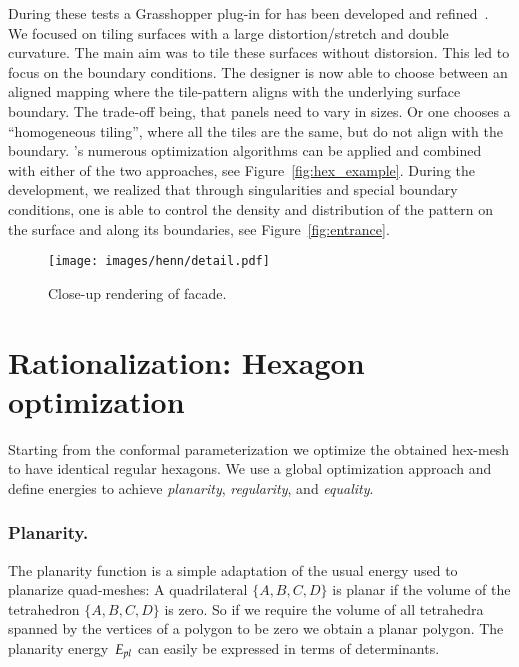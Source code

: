\documentclass[Thesis.tex]{subfiles}
\begin{document}
During these tests a Grasshopper plug-in for \VaryLab has been developed 
and refined~\cite{varylab-web-page}. We focused
on tiling surfaces with a large distortion/stretch and double
curvature. The main aim was to tile these surfaces without
distorsion. This led to focus on the boundary conditions. The designer
is now able to choose between an aligned mapping where the tile-pattern
aligns with the underlying surface boundary. The trade-off being, that
panels need to vary in sizes. Or one chooses a ``homogeneous tiling'',
where all the tiles are the same, but do not align with the
boundary. \VaryLab's numerous optimization algorithms can be applied
and combined with either of the two approaches, see
Figure~\ref{fig:hex_example}. During the development, we realized that
through singularities and special boundary conditions, one is able to
control the density and distribution of the pattern on the surface and
along its boundaries, see Figure~\ref{fig:entrance}.

\begin{figure}[bt]
  \centering
  \texttt{[image: images/henn/detail.pdf]}
  \caption{Close-up rendering of facade.}
  \label{fig:detail}
\end{figure}


\newcommand{\Ealpha}{E_\alpha}
\newcommand{\Eedge}{E_\ell}

\section{Rationalization: Hexagon optimization}
\label{sec:regular_hexagons}

Starting from the conformal parameterization we optimize the obtained
hex-mesh to have identical regular hexagons. We use a global
optimization approach and define energies to achieve \emph{planarity},
\emph{regularity}, and \emph{equality}.

\subsubsection{Planarity.} 
The planarity function is a simple adaptation of the usual energy used
to planarize quad-meshes: A quadrilateral $\{A, B, C, D\}$ is planar
if the volume of the tetrahedron $\{A, B, C, D\}$ is zero. So if we
require the volume of all tetrahedra spanned by the vertices of a polygon
to be zero we obtain a planar polygon.  The planarity energy~$E_{pl}$
can easily be expressed in terms of determinants.
\end{document}
